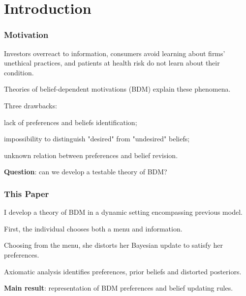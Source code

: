 \documentclass[usenames,dvipsnames,aspectratio=169,11pt, envcountsect]{beamer}
\begin{document}
\section{Introduction}

\begin{frame}
	\maketitle

\end{frame}

\begin{frame}\frametitle{Motivation}

	Investors overreact to information, consumers avoid learning about firms' unethical practices, and patients at health risk do not learn about their condition.

	\vfill

	Theories of belief-dependent motivations (BDM) explain these phenomena.

	\vfill \pause

	Three drawbacks:

	\vfill

	\begin{wideitemize}
		\item lack of preferences and beliefs identification;
		\item impossibility to distinguish "desired" from "undesired" beliefs;
		\item unknown relation between preferences and belief revision.
	\end{wideitemize}

	\vfill

	\textbf{Question}: can we develop a testable theory of BDM?

\end{frame}

\begin{frame}\frametitle{This Paper}

	I develop a theory of BDM in a dynamic setting encompassing previous model.

	\vfill

	First, the individual chooses both a menu and information.

	\vfill

	Choosing from the menu, she distorts her Bayesian update to satisfy her preferences.

	\vfill

	Axiomatic analysis identifies preferences, prior beliefs and distorted posteriors.

	\vfill

	\textbf{Main result}: representation of BDM preferences and belief updating rules.

\end{frame}
\end{document}
